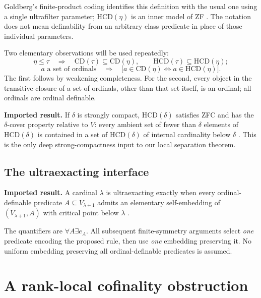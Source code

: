 \documentclass[11pt,letterpaper]{article}
\theoremstyle{definition}
\newcommand{\CD}{\mathrm{CD}}
\newcommand{\HCD}{\mathrm{HCD}}
\newcommand{\blackbox}{\textbf{Imported result.} }
\begin{document}
Goldberg's finite-product coding identifies this definition with the usual one using a single ultrafilter parameter; $\HCD(\eta)$ is an inner model of ZF \cite[Propositions 4.2--4.3]{unique}. The notation does not mean definability from an arbitrary class predicate in place of those individual parameters.

Two elementary observations will be used repeatedly:
\begin{equation}\label{eq:monotone}
 \eta\leq\tau\quad\Longrightarrow\quad
 \CD(\tau)\subseteq\CD(\eta),\qquad
 \HCD(\tau)\subseteq\HCD(\eta);
\end{equation}
\begin{equation}\label{eq:ordsets}
 a\text{ a set of ordinals}\quad\Longrightarrow\quad
 \bigl[a\in\CD(\eta)\iff a\in\HCD(\eta)\bigr].
\end{equation}
The first follows by weakening completeness. For the second, every object in the transitive closure of a set of ordinals, other than that set itself, is an ordinal; all ordinals are ordinal definable.

\blackbox If $\delta$ is strongly compact, $\HCD(\delta)$ satisfies ZFC and has the $\delta$-cover property relative to $V$: every ambient set of fewer than $\delta$ elements of $\HCD(\delta)$ is contained in a set of $\HCD(\delta)$ of internal cardinality below $\delta$ \cite[Corollary 4.7 and Theorem 4.14]{unique}. This is the only deep strong-compactness input to our local separation theorem.

\subsection{The ultraexacting interface}

\blackbox A cardinal $\lambda$ is ultraexacting exactly when every ordinal-definable predicate $A\subseteq V_{\lambda+1}$ admits an elementary self-embedding of $(V_{\lambda+1},A)$ with critical point below $\lambda$ \cite[Theorem B / Theorem 3.1]{abgl}.

The quantifiers are $\forall A\exists e_A$. All subsequent finite-symmetry arguments select \emph{one} predicate encoding the proposed rule, then use \emph{one} embedding preserving it. No uniform embedding preserving all ordinal-definable predicates is assumed.

\section{A rank-local cofinality obstruction}\label{sec:cofinal}
\end{document}
